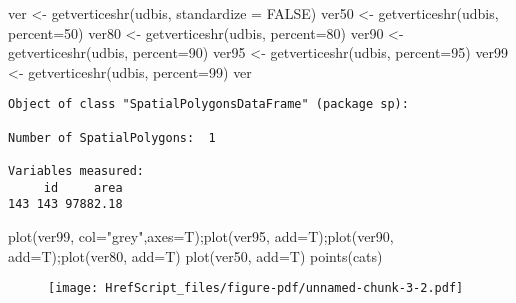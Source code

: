 \documentclass[
  letterpaper,
]{book}
\newenvironment{Shaded}{\begin{snugshade}}{\end{snugshade}}
\newcommand{\AttributeTok}[1]{\textcolor[rgb]{0.40,0.45,0.13}{#1}}
\newcommand{\ConstantTok}[1]{\textcolor[rgb]{0.56,0.35,0.01}{#1}}
\newcommand{\DecValTok}[1]{\textcolor[rgb]{0.68,0.00,0.00}{#1}}
\newcommand{\FunctionTok}[1]{\textcolor[rgb]{0.28,0.35,0.67}{#1}}
\newcommand{\NormalTok}[1]{\textcolor[rgb]{0.00,0.23,0.31}{#1}}
\newcommand{\OtherTok}[1]{\textcolor[rgb]{0.00,0.23,0.31}{#1}}
\newcommand{\StringTok}[1]{\textcolor[rgb]{0.13,0.47,0.30}{#1}}
\begin{document}
\begin{Shaded}
\begin{Highlighting}[]
\NormalTok{ver }\OtherTok{\textless{}{-}} \FunctionTok{getverticeshr}\NormalTok{(udbis, }\AttributeTok{standardize =} \ConstantTok{FALSE}\NormalTok{)}
\NormalTok{ver50 }\OtherTok{\textless{}{-}} \FunctionTok{getverticeshr}\NormalTok{(udbis, }\AttributeTok{percent=}\DecValTok{50}\NormalTok{)}
\NormalTok{ver80 }\OtherTok{\textless{}{-}} \FunctionTok{getverticeshr}\NormalTok{(udbis, }\AttributeTok{percent=}\DecValTok{80}\NormalTok{)}
\NormalTok{ver90 }\OtherTok{\textless{}{-}} \FunctionTok{getverticeshr}\NormalTok{(udbis, }\AttributeTok{percent=}\DecValTok{90}\NormalTok{)}
\NormalTok{ver95 }\OtherTok{\textless{}{-}} \FunctionTok{getverticeshr}\NormalTok{(udbis, }\AttributeTok{percent=}\DecValTok{95}\NormalTok{)}
\NormalTok{ver99 }\OtherTok{\textless{}{-}} \FunctionTok{getverticeshr}\NormalTok{(udbis, }\AttributeTok{percent=}\DecValTok{99}\NormalTok{)}
\NormalTok{ver}
\end{Highlighting}
\end{Shaded}

\begin{verbatim}
Object of class "SpatialPolygonsDataFrame" (package sp):

Number of SpatialPolygons:  1

Variables measured:
     id     area
143 143 97882.18
\end{verbatim}

\begin{Shaded}
\begin{Highlighting}[]
\FunctionTok{plot}\NormalTok{(ver99, }\AttributeTok{col=}\StringTok{"grey"}\NormalTok{,}\AttributeTok{axes=}\NormalTok{T);}\FunctionTok{plot}\NormalTok{(ver95, }\AttributeTok{add=}\NormalTok{T);}\FunctionTok{plot}\NormalTok{(ver90, }\AttributeTok{add=}\NormalTok{T);}\FunctionTok{plot}\NormalTok{(ver80, }\AttributeTok{add=}\NormalTok{T)}
\FunctionTok{plot}\NormalTok{(ver50, }\AttributeTok{add=}\NormalTok{T)}
\FunctionTok{points}\NormalTok{(cats)}
\end{Highlighting}
\end{Shaded}

\begin{figure}[H]

{\centering \texttt{[image: HrefScript\_files/figure-pdf/unnamed-chunk-3-2.pdf]}

}

\end{figure}
\end{document}

